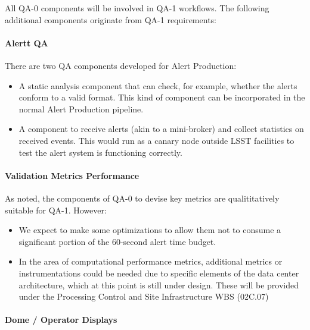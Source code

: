 All QA-0 components will be involved in QA-1 workflows. The following additional components originate from QA-1 requirements:

\paragraph{Alertt QA}
\label{sec:qaAlertQA}

There are two QA components developed for Alert Production:

\begin{itemize}

\item A static analysis component that can check, for example, whether the alerts conform to a valid format. This kind of component can be incorporated in the normal Alert Production pipeline.

\item A component to receive alerts (akin to a mini-broker) and collect statistics on received events. This would run as a canary node outside LSST facilities to test the alert system is functioning correctly.

\end{itemize}

\paragraph{Validation Metrics Performance}
\label{sec:qaPerfValidate}

As noted, the components of QA-0 to devise key metrics are
qualititatively suitable for QA-1. However:

\begin{itemize}

\item We expect to make some optimizations to allow them not to consume a significant portion of the 60-second alert time budget.

\item In the area of computational performance metrics, additional metrics or instrumentations could be needed due to specific elements of the data center architecture, which at this point is still under design. These will be provided under the Processing Control and Site Infrastructure WBS (02C.07)

\end{itemize}

\paragraph{Dome / Operator Displays}
\label{sec:qaDomeDisplay}

